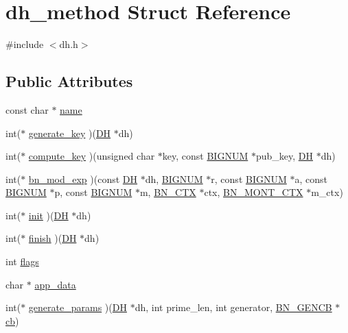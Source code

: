 \hypertarget{structdh__method}{}\section{dh\+\_\+method Struct Reference}
\label{structdh__method}


{\ttfamily \#include $<$dh.\+h$>$}

\subsection*{Public Attributes}
\begin{DoxyCompactItemize}
\item 
const char $\ast$ \hyperlink{structdh__method_a87f4af9c60229836248385adca5caa21}{name}
\item 
int($\ast$ \hyperlink{structdh__method_aa044fbb69099292fac13ab075afbe8cd}{generate\+\_\+key} )(\hyperlink{ossl__typ_8h_a5a5072cfe75a51d0ff201c0a8d2d68b2}{DH} $\ast$dh)
\item 
int($\ast$ \hyperlink{structdh__method_a1377905955b360c0113cc24643110c28}{compute\+\_\+key} )(unsigned char $\ast$key, const \hyperlink{ossl__typ_8h_a6fb19728907ec6515e4bfb716bffa141}{B\+I\+G\+N\+UM} $\ast$pub\+\_\+key, \hyperlink{ossl__typ_8h_a5a5072cfe75a51d0ff201c0a8d2d68b2}{DH} $\ast$dh)
\item 
int($\ast$ \hyperlink{structdh__method_af5261585e1ca4edaa2edd70a77f72274}{bn\+\_\+mod\+\_\+exp} )(const \hyperlink{ossl__typ_8h_a5a5072cfe75a51d0ff201c0a8d2d68b2}{DH} $\ast$dh, \hyperlink{ossl__typ_8h_a6fb19728907ec6515e4bfb716bffa141}{B\+I\+G\+N\+UM} $\ast$r, const \hyperlink{ossl__typ_8h_a6fb19728907ec6515e4bfb716bffa141}{B\+I\+G\+N\+UM} $\ast$a, const \hyperlink{ossl__typ_8h_a6fb19728907ec6515e4bfb716bffa141}{B\+I\+G\+N\+UM} $\ast$p, const \hyperlink{ossl__typ_8h_a6fb19728907ec6515e4bfb716bffa141}{B\+I\+G\+N\+UM} $\ast$m, \hyperlink{ossl__typ_8h_a0b235a35b7dd7922c097571ecd90e2bc}{B\+N\+\_\+\+C\+TX} $\ast$ctx, \hyperlink{ossl__typ_8h_aec902d353e00ced6d3fee6cd033a8bd0}{B\+N\+\_\+\+M\+O\+N\+T\+\_\+\+C\+TX} $\ast$m\+\_\+ctx)
\item 
int($\ast$ \hyperlink{structdh__method_a672b716394908a7d67984290a41015c9}{init} )(\hyperlink{ossl__typ_8h_a5a5072cfe75a51d0ff201c0a8d2d68b2}{DH} $\ast$dh)
\item 
int($\ast$ \hyperlink{structdh__method_adc4990f1d4887b7a495fa452d7ebfcf2}{finish} )(\hyperlink{ossl__typ_8h_a5a5072cfe75a51d0ff201c0a8d2d68b2}{DH} $\ast$dh)
\item 
int \hyperlink{structdh__method_ab1ae3816d0648ee6d7345087df0fa61c}{flags}
\item 
char $\ast$ \hyperlink{structdh__method_a01cec981a5f6dd3386a24f083cf9812d}{app\+\_\+data}
\item 
int($\ast$ \hyperlink{structdh__method_ae2c9fce365f3381757c58f0e00441453}{generate\+\_\+params} )(\hyperlink{ossl__typ_8h_a5a5072cfe75a51d0ff201c0a8d2d68b2}{DH} $\ast$dh, int prime\+\_\+len, int generator, \hyperlink{ossl__typ_8h_ae122a8be18f4fe821e5389381ececa09}{B\+N\+\_\+\+G\+E\+N\+CB} $\ast$\hyperlink{pem_8h_a92c578a1a1d2733de8cf205957a962fc}{cb})
\end{DoxyCompactItemize}


